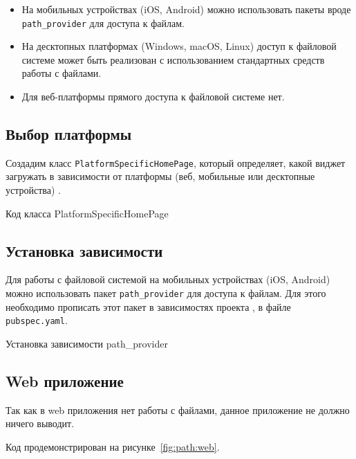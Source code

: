 \begin{itemize}
	\item На мобильных устройствах (iOS, Android)
		можно использовать пакеты вроде
		\texttt{path\_provider} для доступа к файлам.
	\item На десктопных платформах (Windows, macOS, Linux)
		доступ к файловой системе может быть реализован
		с использованием стандартных средств работы с файлами.
	\item Для веб-платформы прямого доступа к файловой системе нет.
\end{itemize}

\subsection{Выбор платформы}

Создадим класс \texttt{PlatformSpecificHomePage},
который определяет, какой виджет загружать в зависимости от платформы
(веб, мобильные или десктопные устройства)
.

\begin{image}
	\caption{Код класса PlatformSpecificHomePage}
	\label{fig:path:home}
\end{image}

\subsection{Установка зависимости}

Для работы с файловой системой на мобильных устройствах (iOS, Android)
можно использовать пакет \texttt{path\_provider} для доступа к файлам.
Для этого необходимо прописать этот пакет
в зависимостях проекта , в файле \texttt{pubspec.yaml}.

\begin{image}
	\caption{Установка зависимости path\_provider}
	\label{fig:path:dep}
\end{image}

\subsection{Web приложение}

Так как в web приложения нет работы с файлами, данное приложение не должно
ничего выводит.

Код продемонстрирован на рисунке~\ref{fig:path:web}.

